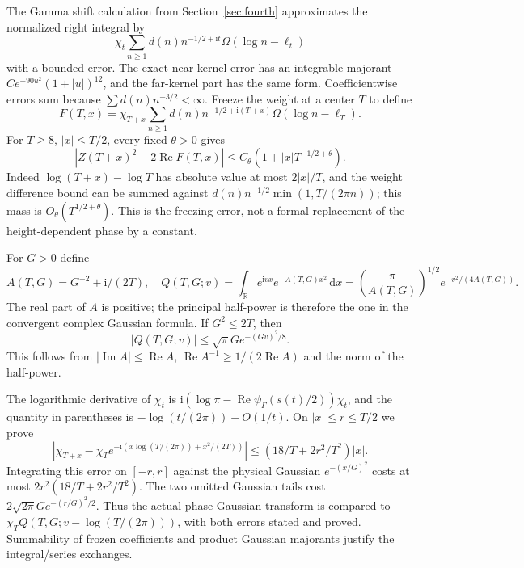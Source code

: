 \documentclass[11pt,a4paper]{article}
\numberwithin{equation}{section}
\theoremstyle{definition}
\newcommand{\R}{\mathbb R}
\newcommand{\dd}{\,\mathrm d}
\newcommand{\ii}{\mathrm i}
\newcommand{\Rea}{\operatorname{Re}}
\newcommand{\Ima}{\operatorname{Im}}
\newcommand{\zabs}{Z}
\begin{document}
The Gamma shift calculation from Section~\ref{sec:fourth} approximates the
normalized right integral by
\[
 \chi_t\sum_{n\ge1}d(n)n^{-1/2+\ii t}\Omega(\log n-\ell_t)
\]
with a bounded error. The exact near-kernel error has an integrable majorant
$C e^{-90u^2}(1+|u|)^{12}$, and the far-kernel part has the same form.
Coefficientwise errors sum because $\sum d(n)n^{-3/2}<\infty$.
Freeze the weight at a center $T$ to define
\[
 F(T,x)=\chi_{T+x}\sum_{n\ge1}d(n)n^{-1/2+\ii(T+x)}\Omega(\log n-\ell_T).
\]
For $T\ge8$, $|x|\le T/2$, every fixed $\theta>0$ gives
\begin{equation}\label{eq:frozenerror}
 |\zabs(T+x)^2-2\Rea F(T,x)|\le C_\theta(1+|x|T^{-1/2+\theta}).
\end{equation}
Indeed $\log(T+x)-\log T$ has absolute value at most $2|x|/T$,
and the weight difference bound can be summed against
$d(n)n^{-1/2}\min(1,T/(2\pi n))$; this mass is
$O_\theta(T^{1/2+\theta})$. This is the freezing error, not a
formal replacement of the height-dependent phase by a constant.

For $G>0$ define
\[
 A(T,G)=G^{-2}+\ii/(2T),\quad
 Q(T,G;v)=\int_{\R}e^{\ii vx}e^{-A(T,G)x^2}\dd x
       =\left(\frac\pi{A(T,G)}\right)^{1/2}e^{-v^2/(4A(T,G))}.
\]
The real part of $A$ is positive; the principal half-power is therefore the
one in the convergent complex Gaussian formula. If $G^2\le2T$, then
\begin{equation}\label{eq:Gaussianbound}
 |Q(T,G;v)|\le\sqrt\pi G e^{-(Gv)^2/8}.
\end{equation}
This follows from $|\Ima A|\le\Rea A$,
$\Rea A^{-1}\ge1/(2\Rea A)$ and the norm of the half-power.

The logarithmic derivative of $\chi_t$ is
$\ii(\log\pi-\Rea\psi_\Gamma(s(t)/2))\chi_t$, and the quantity in parentheses
is $-\log(t/(2\pi))+O(1/t)$. On $|x|\le r\le T/2$ we prove
\[
 |\chi_{T+x}-\chi_Te^{-\ii(x\log(T/(2\pi))+x^2/(2T))}|
 \le(18/T+2r^2/T^2)|x|.
\]
Integrating this error on $[-r,r]$ against the physical Gaussian
$e^{-(x/G)^2}$ costs at most $2r^2(18/T+2r^2/T^2)$.
The two omitted Gaussian tails cost
$2\sqrt{2\pi}G e^{-(r/G)^2/2}$. Thus the actual phase-Gaussian transform
is compared to $\chi_T Q(T,G;v-\log(T/(2\pi)))$, with both errors stated
and proved. Summability of frozen coefficients and product Gaussian
majorants justify the integral/series exchanges.
\end{document}
